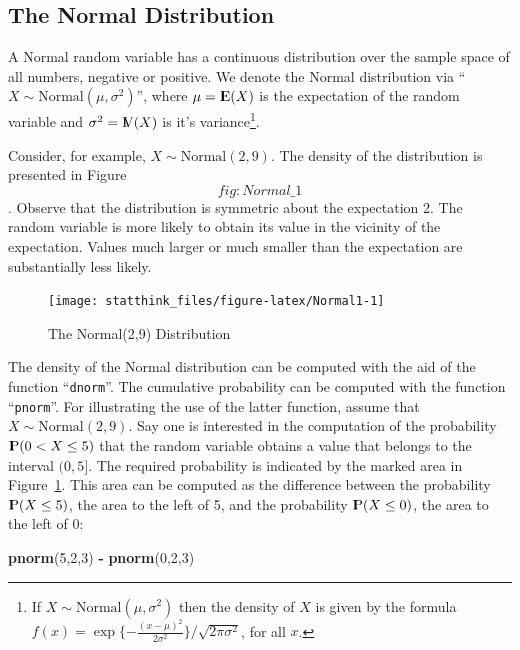 \documentclass[]{krantz}
\makeatletter
\newenvironment{Shaded}{\begin{snugshade}}{\end{snugshade}}
\newcommand{\KeywordTok}[1]{\textcolor[rgb]{0.13,0.29,0.53}{\textbf{#1}}}
\newcommand{\DecValTok}[1]{\textcolor[rgb]{0.00,0.00,0.81}{#1}}
\newcommand{\StringTok}[1]{\textcolor[rgb]{0.31,0.60,0.02}{#1}}
\newcommand{\OperatorTok}[1]{\textcolor[rgb]{0.81,0.36,0.00}{\textbf{#1}}}
\newcommand{\NormalTok}[1]{#1}
\newcommand{\Expec}{{\rm I\kern-.3em E}}
\newcommand{\Prob}{{\rm I\kern-.3em P}}
\newcommand{\Var}{{\rm I\kern-.3em V}}
\newenvironment{kframe}{%
\medskip{}
\setlength{\fboxsep}{.8em}
 \def\at@end@of@kframe{}%
 \ifinner\ifhmode%
  \def\at@end@of@kframe{\end{minipage}}%
  \begin{minipage}{\columnwidth}%
 \fi\fi%
 \def\FrameCommand##1{\hskip\@totalleftmargin \hskip-\fboxsep
 \colorbox{shadecolor}{##1}\hskip-\fboxsep
     \hskip-\linewidth \hskip-\@totalleftmargin \hskip\columnwidth}%
 \MakeFramed {\advance\hsize-\width
   \@totalleftmargin\z@ \linewidth\hsize
   \@setminipage}}%
 {\par\unskip\endMakeFramed%
 \at@end@of@kframe}
\renewenvironment{Shaded}{\begin{kframe}}{\end{kframe}}
\theoremstyle{definition}
\theoremstyle{definition}
\theoremstyle{definition}
\theoremstyle{remark}
\makeatother
\begin{document}
\subsection{The Normal Distribution}\label{the-normal-distribution}

A Normal random variable has a continuous distribution over the sample
space of all numbers, negative or positive. We denote the Normal
distribution via ``\(X \sim \mathrm{Normal}(\mu, \sigma^2)\)'', where
\(\mu = \Expec(X)\) is the expectation of the random variable and
\(\sigma^2 = \Var(X)\) is it's variance\footnote{If
  \(X \sim \mbox{Normal}(\mu,\sigma^2)\) then the density of \(X\) is
  given by the formula
  \(f(x) = \exp\{-\frac{(x-\mu)^2}{2 \sigma^2}\}/\sqrt{2 \pi \sigma^2}\),
  for all \(x\).}.

Consider, for example, \(X \sim \mathrm{Normal}(2,9)\). The density of
the distribution is presented in Figure~\[fig:Normal\_1\]. Observe that
the distribution is symmetric about the expectation 2. The random
variable is more likely to obtain its value in the vicinity of the
expectation. Values much larger or much smaller than the expectation are
substantially less likely.

\begin{figure}

{\centering \texttt{[image: statthink\_files/figure-latex/Normal1-1]} 

}

\caption{The Normal(2,9) Distribution}\label{fig:Normal1}
\end{figure}

The density of the Normal distribution can be computed with the aid of
the function ``\texttt{dnorm}''. The cumulative probability can be
computed with the function ``\texttt{pnorm}''. For illustrating the use
of the latter function, assume that \(X \sim \mathrm{Normal}(2,9)\). Say
one is interested in the computation of the probability
\(\Prob(0 < X \leq 5)\) that the random variable obtains a value that
belongs to the interval \((0,5]\). The required probability is indicated
by the marked area in Figure~\ref{fig:Normal1}. This area can be
computed as the difference between the probability \(\Prob(X \leq 5)\),
the area to the left of 5, and the probability \(\Prob(X \leq 0)\), the
area to the left of 0:

\begin{Shaded}
\begin{Highlighting}[]
\KeywordTok{pnorm}\NormalTok{(}\DecValTok{5}\NormalTok{,}\DecValTok{2}\NormalTok{,}\DecValTok{3}\NormalTok{) }\OperatorTok{-}\StringTok{ }\KeywordTok{pnorm}\NormalTok{(}\DecValTok{0}\NormalTok{,}\DecValTok{2}\NormalTok{,}\DecValTok{3}\NormalTok{)}
\end{Highlighting}
\end{Shaded}
\end{document}
